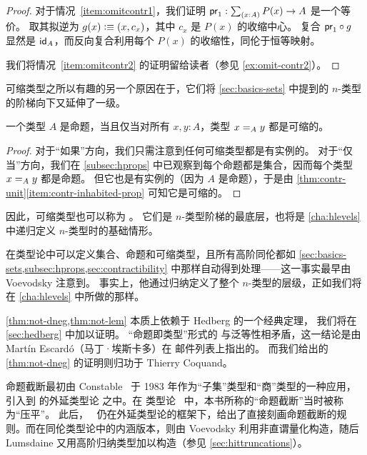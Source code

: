 \begin{proof}
  对于情况~\ref{item:omitcontr1}，我们证明 $\proj1:\sm{x:A} P(x) \to A$ 是一个等价。
  取其拟逆为 $g(x)\defeq (x,c_x)$，其中 $c_x$ 是 $P(x)$ 的收缩中心。
  复合 $\proj1 \circ g$ 显然是 $\idfunc[A]$，而反向复合利用每个 $P(x)$ 的收缩性，同伦于恒等映射。

  我们将情况~\ref{item:omitcontr2} 的证明留给读者（参见 \cref{ex:omit-contr2}）。
\end{proof}

可缩类型之所以有趣的另一个原因在于，它们将 \cref{sec:basics-sets} 中提到的 $n$-类型的阶梯向下又延伸了一级。

\begin{lem}\label{thm:prop-minusonetype}
  一个类型 $A$ 是命题，当且仅当对所有 $x,y:A$，类型 $\id[A]xy$ 都是可缩的。
\end{lem}

\begin{proof}
  对于“如果”方向，我们只需注意到任何可缩类型都是有实例的。
  对于“仅当”方向，我们在 \cref{subsec:hprops} 中已观察到每个命题都是集合，因而每个类型 $\id[A]xy$ 都是命题。
  但它也是有实例的（因为 $A$ 是命题），于是由 \cref{thm:contr-unit}\ref{item:contr-inhabited-prop} 可知它是可缩的。
\end{proof}

因此，可缩类型也可以称为 。
它们是 $n$-类型阶梯的最底层，也将是 \cref{cha:hlevels} 中递归定义 $n$-类型时的基础情形。

%
%

\sectionNotes

在类型论中可以定义集合、命题和可缩类型，且所有高阶同伦都如 \cref{sec:basics-sets,subsec:hprops,sec:contractibility} 中那样自动得到处理——这一事实最早由 Voevodsky 注意到。
事实上，他通过归纳定义了整个 $n$-类型的层级，正如我们将在 \cref{cha:hlevels} 中所做的那样。%

\cref{thm:not-dneg,thm:not-lem} 本质上依赖于 Hedberg 的一个经典定理，
%
%
我们将在 \cref{sec:hedberg} 中加以证明。
“命题即类型”形式的 \LEM{} 与泛等性相矛盾，这一结论是由 Martín Escardó（马丁·埃斯卡多）在 \Agda 邮件列表上指出的。
而我们给出的 \cref{thm:not-dneg} 的证明则归功于 Thierry Coquand。

命题截断最初由 Constable~\cite{Con85} 于 1983 年作为“子集”类型和“商”类型的一种应用，引入到 \NuPRL 的外延类型论
%
之中。在 \NuPRL 类型论~\cite{constable+86nuprl-book} 中，本书所称的“命题截断”当时被称为“压平”。
此后，~\cite{ab:bracket-types} 仍在外延类型论的框架下，给出了直接刻画命题截断的规则。而在同伦类型论中的内涵版本，则由 Voevodsky 利用非直谓量化构造，随后 Lumsdaine 又用高阶归纳类型加以构造（参见 \cref{sec:hittruncations}）。

